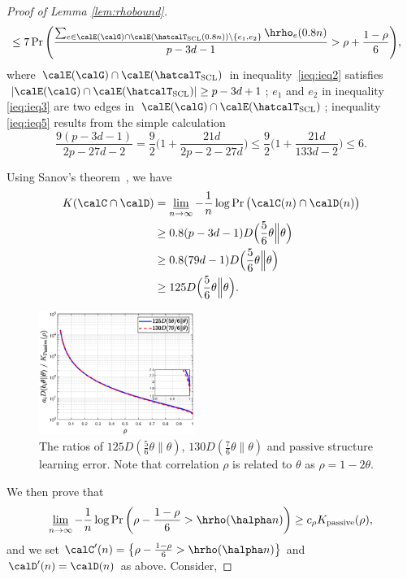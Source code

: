 \documentclass[11pt,onecolumn]{article}
\newcommand{\Passive}{{\rm passive}}
\begin{document}
\begin{proof}[Proof of Lemma \ref{lem:rhobound}]
\begin{align}
		&\leq 7\Pr\Bigg(\frac{\sum_{e\in\calE(\calG)\cap\calE( \hatcalT_{\rm{SCL}}(0.8 n))\backslash \{e_{1},e_{2}\}}\hrho_{e}(0.8 n)}{p-3d-1}>\rho+\frac{1-\rho}{6}\Bigg),
	\end{align}
	where $\calE(\calG)\cap\calE( \hatcalT_{\rm{SCL}})$ in inequality~\eqref{ieq:ieq2} satisfies $|\calE(\calG)\cap\calE( \hatcalT_{\rm{SCL}})|\geq p-3d+1$; $e_{1}$ and $e_{2} $ in inequality \eqref{ieq:ieq3} are two edges in $\calE(\calG)\cap\calE( \hatcalT_{\rm{SCL}})$; inequality \eqref{ieq:ieq5} results from the simple calculation
	\begin{equation}
	    	\frac{9(p-3d-1)}{2p-27d-2}=\frac{9}{2}\Big(1+\frac{21d}{2p-2-27d}\Big)\leq\frac{9}{2}\Big(1+\frac{21d}{133d-2}\Big)\leq 6.
	\end{equation}

	Using Sanov's theorem~\cite{zeitouni1998large}, we have
	\begin{align}
		K (\calC\cap \calD)&=\varliminf_{n\rightarrow\infty}-\frac{1}{n}\log\Pr\big( \calC(n)\cap \calD(n)\big)\\
		&\geq 0.8(p-3d-1)D\Big(\frac{5}{6}\theta\Big\|\theta\Big)\\
		&\geq 0.8(79d-1)D\Big(\frac{5}{6}\theta\Big\|\theta\Big)\\
		&\geq 125D\Big(\frac{5}{6}\theta\Big\|\theta\Big).
	\end{align}
	\begin{figure}[t]
		\centering 
		\includegraphics[width=0.45\textwidth]{thetaKL.eps} 
		\caption{The ratios of  $125D(\frac{5}{6}\theta\|\theta)$, $130D(\frac{7}{6}\theta\|\theta)$ and passive structure learning error. Note that correlation $\rho$ is related to $\theta$ as $\rho=1-2\theta$.} 
		\label{fig:thetaKL} 
	\end{figure}
	We then prove that 
	\begin{equation}
	\varliminf_{n\rightarrow\infty}-\frac{1}{n}\log\Pr\bigg(\rho-\frac{1-\rho}{6}>\hrho(\halpha n)\bigg)\geq c_{\rho}K _{\Passive}(\rho),
	\end{equation}
	and we set $ \calC^{\prime}(n)=\big\{\rho-\frac{1-\rho}{6}>\hrho(\halpha n)\big\}$ and $\calD^{\prime}(n)=\calD(n)$ as above. Consider,

\end{proof}
\end{document}
